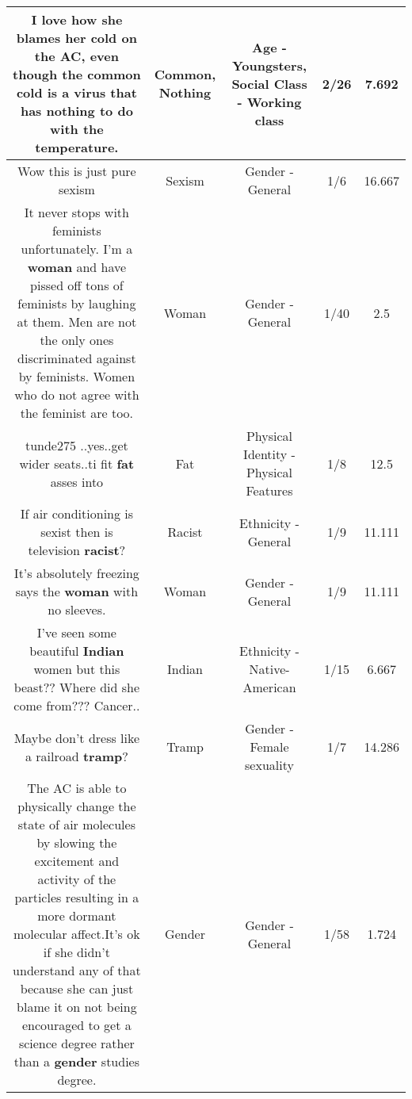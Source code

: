 \documentclass[11pt]{article}
\newlength\mylength
\begin{document}
\begin{center}
\begin{longtable}{|C{.65\mylength}|C{.30\mylength}|C{.12\mylength}|C{.12\mylength}|C{.12\mylength}|}
  \small I love how she blames her cold on the AC, even though the \textbf{common} cold is a virus that has \textbf{nothing} to do with the temperature.\normalsize   & Common, Nothing & Age - Youngsters, Social Class - Working class & 2/26 & 7.692 \\  \hline
  \small Wow this is just pure sexism\normalsize   & Sexism & Gender - General & 1/6 & 16.667 \\  \hline
  \small It never stops with feminists unfortunately. I'm a \textbf{woman} and have pissed off tons of feminists by laughing at them. Men are not the only ones discriminated against by feminists. Women who do not agree with the feminist are too.\normalsize   & Woman & Gender - General & 1/40 & 2.5 \\  \hline
  \small tunde275 ..yes..get wider seats..ti fit \textbf{fat} asses into\normalsize   & Fat & Physical Identity - Physical Features & 1/8 & 12.5 \\  \hline
  \small If air conditioning is sexist then is television \textbf{racist}?\normalsize   & Racist & Ethnicity - General & 1/9 & 11.111 \\  \hline
  \small It's absolutely freezing says the \textbf{woman} with no sleeves.\normalsize   & Woman & Gender - General & 1/9 & 11.111 \\  \hline
  \small I've seen some beautiful \textbf{Indian} women but this beast?? Where did she come from??? Cancer..\normalsize   & Indian & Ethnicity - Native-American & 1/15 & 6.667 \\  \hline
  \small Maybe don't dress like a railroad \textbf{tramp}?\normalsize   & Tramp & Gender - Female sexuality & 1/7 & 14.286 \\  \hline
  \small The AC is able to physically change the state of air molecules by slowing the excitement and activity of the particles resulting in a more dormant molecular affect.It's ok if she didn't understand any of that because she can just blame it on not being encouraged to get a science degree rather than a \textbf{gender} studies degree.\normalsize   & Gender & Gender - General & 1/58 & 1.724 \\  \hline

\end{longtable}
\end{center}
\end{document}
